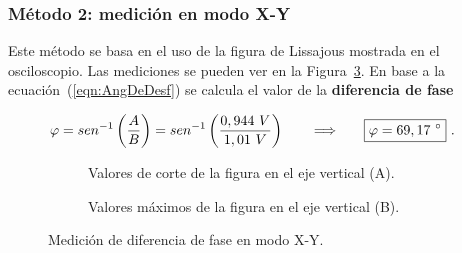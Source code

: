     \subsubsection*{Método 2: medición en modo X-Y}
    Este método se basa en el uso de la figura de Lissajous mostrada en el osciloscopio. Las mediciones se pueden ver en la 
    Figura~\ref{fig:DesfaseConLissajous}. En base a la ecuación~(\ref{eqn:AngDeDesf}) se calcula el valor de la 
    \textbf{diferencia de fase}
    
    \begin{align*}
      \varphi = sen ^{-1} \left( \dfrac{A}{B} \right) = sen ^{-1} \left( \dfrac{0,944\ V}{1,01\ V} \right) \hspace{20pt} \Longrightarrow \hspace{20pt} \Aboxed{\varphi = 69,17\ ^{\circ}}\ .
    \end{align*}

    \begin{figure}[H]
      \centering
      \begin{subfigure}[h]{0.4\textwidth}
        \centering
        \caption{Valores de corte de la figura en el eje vertical (A).}
        \label{fig:CortesEjeVertical_Lissajous}
      \end{subfigure}
      \hspace{20pt} 
      \begin{subfigure}[h]{0.4\textwidth}
        \centering
        \caption{Valores máximos de la figura en el eje vertical (B).}
        \label{fig:MaximosEjeVertical_Lissajous}
      \end{subfigure}
      \caption{Medición de diferencia de fase en  modo X-Y.}
      \label{fig:DesfaseConLissajous}
    \end{figure}


